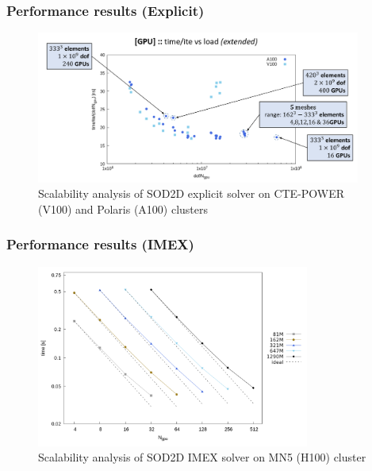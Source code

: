 \begin{frame}
	\frametitle{Performance results (Explicit)}
	\begin{figure}
		\centering
		\includegraphics[width=0.95\textwidth]{images/uCurve.png}
		\caption{Scalability analysis of SOD2D explicit solver on CTE-POWER (V100) and Polaris (A100) clusters}
	\end{figure}
\end{frame}

\begin{frame}
	\frametitle{Performance results (IMEX)}
	\begin{figure}
		\centering
		\includegraphics[width=0.8\textwidth]{images/comp_imex_MN5_H100_idealref_gpu.png}
		\caption{Scalability analysis of SOD2D IMEX solver on MN5 (H100) cluster}
	\end{figure}
\end{frame}